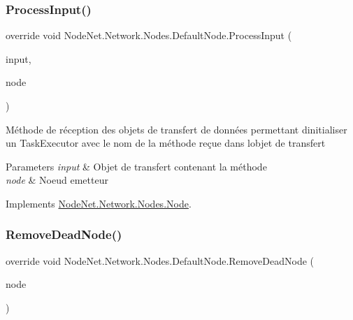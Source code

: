 \subsubsection{\texorpdfstring{Process\+Input()}{ProcessInput()}}
{\footnotesize\ttfamily override void Node\+Net.\+Network.\+Nodes.\+Default\+Node.\+Process\+Input (\begin{DoxyParamCaption}\item[{\hyperlink{class_node_net_1_1_data_1_1_data_input}{Data\+Input}}]{input,  }\item[{\hyperlink{class_node_net_1_1_network_1_1_nodes_1_1_node}{Node}}]{node }\end{DoxyParamCaption})\hspace{0.3cm}{\ttfamily [virtual]}}



Méthode de réception des objets de transfert de données permettant d\textquotesingle{}initialiser un Task\+Executor avec le nom de la méthode reçue dans l\textquotesingle{}objet de transfert 


\begin{DoxyParams}{Parameters}
{\em input} & Objet de transfert contenant la méthode\\
\hline
{\em node} & Noeud emetteur\\
\hline
\end{DoxyParams}


Implements \hyperlink{class_node_net_1_1_network_1_1_nodes_1_1_node_a953dce3f4779355cd3bf542ac6d1d3d8}{Node\+Net.\+Network.\+Nodes.\+Node}.

\mbox{\label{class_node_net_1_1_network_1_1_nodes_1_1_default_node_ab3951a37220f6ca8905727fa45a96fa3}} 
\subsubsection{\texorpdfstring{Remove\+Dead\+Node()}{RemoveDeadNode()}}
{\footnotesize\ttfamily override void Node\+Net.\+Network.\+Nodes.\+Default\+Node.\+Remove\+Dead\+Node (\begin{DoxyParamCaption}\item[{\hyperlink{class_node_net_1_1_network_1_1_nodes_1_1_node}{Node}}]{node }\end{DoxyParamCaption})\hspace{0.3cm}{\ttfamily [virtual]}}



